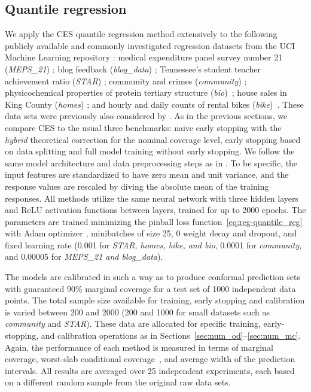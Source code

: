 \FloatBarrier

\subsection{Quantile regression} \label{app:numerical-results-cqr}

We apply the CES quantile regression method extensively to the following publicly available and commonly investigated regression datasets from the UCI Machine Learning repository \cite{Pinar2012}: medical expenditure panel survey number 21 ({\em MEPS\_21}) \cite{meps_21}; blog feedback ({\em blog\_data}) \cite{blog_data}; Tennessee’s student teacher achievement ratio ({\em STAR}) \cite{star}; community and crimes ({\em community}) \cite{community}; physicochemical properties of protein tertiary structure ({\em bio})~\cite{data-bio}; house sales in King County ({\em homes}) \cite{homes}; and hourly and daily counts of rental bikes ({\em bike})~\cite{data-bike}. These data sets were previously also considered by \citet{romano2019conformalized}.
As in the previous sections, we compare CES to the usual three benchmarks: naive early stopping with the {\em hybrid} theoretical correction for the nominal coverage level, early stopping based on data splitting and full model training without early stopping. We follow the same model architecture and data preprocessing steps as in \cite{romano2019conformalized}. To be specific, the input features are standardized to have zero mean and unit variance, and the response values are rescaled by diving the absolute mean of the training responses. All methods utilize the same neural network with three hidden layers and ReLU activation functions between layers, trained for up to 2000 epochs. The parameters are trained minimizing the pinball loss function~\ref{eq:reg-quantile_reg} with Adam optimizer \cite{kingma2014adam}, minibatches of size 25, 0 weight decay and dropout, and fixed learning rate (0.001 for {\em STAR, homes, bike, and bio}, 0.0001 for {\em community}, and 0.00005 for {\em MEPS\_21 and blog\_data}). 

The models are calibrated in such a way as to produce conformal prediction sets with guaranteed 90\% marginal coverage for a test set of 1000 independent data points. The total sample size available for training, early stopping and calibration is varied between 200 and 2000 (200 and 1000 for small datasets such as {\em community} and {\em STAR}).
These data are allocated for specific training, early-stopping, and calibration operations as in Sections~\ref{sec:num_od}--\ref{sec:num_mc}.
Again, the performance of each method is measured in terms of marginal coverage, worst-slab conditional coverage~\cite{cauchois2020knowing}, and average width of the prediction intervals. All results are averaged over 25 independent experiments, each based on a different random sample from the original raw data sets.


